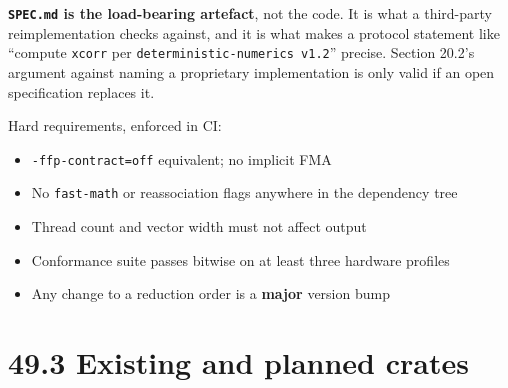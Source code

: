 \documentclass[
  11pt]{report}
\providecommand{\tightlist}{%
  \setlength{\itemsep}{0pt}\setlength{\parskip}{0pt}}
\begin{document}
\textbf{\texttt{SPEC.md} is the load-bearing artefact}, not the code. It
is what a third-party reimplementation checks against, and it is what
makes a protocol statement like ``compute \texttt{xcorr} per
\texttt{deterministic-numerics\ v1.2}'' precise. Section 20.2's argument
against naming a proprietary implementation is only valid if an open
specification replaces it.

Hard requirements, enforced in CI:

\begin{itemize}
\tightlist
\item
  \texttt{-ffp-contract=off} equivalent; no implicit FMA
\item
  No \texttt{fast-math} or reassociation flags anywhere in the
  dependency tree
\item
  Thread count and vector width must not affect output
\item
  Conformance suite passes bitwise on at least three hardware profiles
\item
  Any change to a reduction order is a \textbf{major} version bump
\end{itemize}

\hypertarget{existing-and-planned-crates}{%
\section{49.3 Existing and planned
crates}\label{existing-and-planned-crates}}
\end{document}
